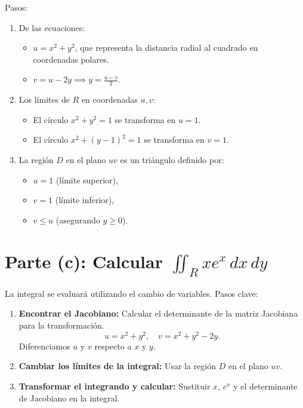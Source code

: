 Pasos:
\begin{enumerate}
    \item De las ecuaciones:
    \begin{itemize}
        \item \( u = x^2 + y^2 \), que representa la distancia radial al cuadrado en coordenadas polares.
        \item \( v = u - 2y \implies y = \frac{u-v}{2} \).
    \end{itemize}
    \item Los límites de \( R \) en coordenadas \( u,v \):
    \begin{itemize}
        \item El círculo \( x^2 + y^2 = 1 \) se transforma en \( u = 1 \).
        \item El círculo \( x^2 + (y-1)^2 = 1 \) se transforma en \( v = 1 \).
    \end{itemize}
    \item La región \( D \) en el plano \( uv \) es un triángulo definido por:
    \begin{itemize}
        \item \( u = 1 \) (límite superior),
        \item \( v = 1 \) (límite inferior),
        \item \( v \leq u \) (asegurando \( y \geq 0 \)).
    \end{itemize}
\end{enumerate}

\section*{Parte (c): Calcular \( \iint_R x e^x \, dx \, dy \)}

La integral se evaluará utilizando el cambio de variables. Pasos clave:
\begin{enumerate}
    \item \textbf{Encontrar el Jacobiano:} Calcular el determinante de la matriz Jacobiana para la transformación.
    \[
    u = x^2 + y^2, \quad v = x^2 + y^2 - 2y.
    \]
    Diferenciamos \( u \) y \( v \) respecto a \( x \) y \( y \).
    \item \textbf{Cambiar los límites de la integral:} Usar la región \( D \) en el plano \( uv \).
    \item \textbf{Transformar el integrando y calcular:} Sustituir \( x \), \( e^x \) y el determinante de Jacobiano en la integral.
\end{enumerate}


